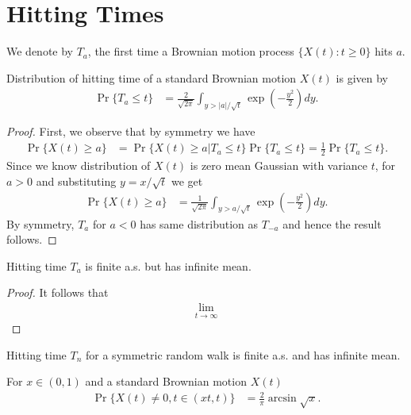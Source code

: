 \documentclass[a4paper,10pt,english]{article}
\begin{document}
\section{Hitting Times}
\begin{defn} We denote by $T_a$, the first time a Brownian motion process $\{X(t): t \geqslant 0\}$ hits $a$.
\end{defn}
\begin{thm} Distribution of hitting time of a standard Brownian motion $X(t)$ is given by
\begin{align*}
\Pr\{T_a \leq t\} &= \frac{2}{\sqrt{2 \pi}}\int_{y > |a|/\sqrt{t}}\exp\left(-\frac{y^2}{2}\right)dy.
\end{align*}
\end{thm}
\begin{proof} First, we observe that by symmetry we have
\begin{align*}
\Pr\{X(t) \geq a\} &= \Pr\{X(t) \geq a | T_a \leq t\}\Pr\{T_a \leq t\} = \frac{1}{2}\Pr\{T_a \leq t\}.%
\end{align*}
Since we know distribution of $X(t)$ is zero mean Gaussian with variance $t$, for $a > 0$ and substituting $y = x/\sqrt{t}$ we get
\begin{align*}
\Pr\{X(t) \geq a\} &= \frac{1}{\sqrt{2\pi}}\int_{y > a/\sqrt{t}}\exp(-\frac{y^2}{2})dy.
\end{align*}
By symmetry, $T_a$ for $a < 0$ has same distribution as $T_{-a}$ and hence the result follows.
\end{proof}
\begin{cor} Hitting time $T_a$ is finite a.s. but has infinite mean.
\end{cor}
\begin{proof} It follows that 
\begin{align*}
\lim_{t \to \infty}
\end{align*}
\end{proof}
\begin{rem} Hitting time $T_n$ for a symmetric random walk is finite a.s. and has infinite mean.
\end{rem}
\begin{prop} For $x \in (0,1)$ and a standard Brownian motion $X(t)$
\begin{align*}
\Pr\{X(t) \neq 0, t \in (xt, t)\} &= \frac{2}{\pi}\arcsin\sqrt{x}.
\end{align*}
\end{prop}
\end{document}
